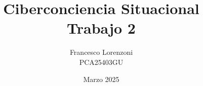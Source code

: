 


\title{Ciberconciencia Situacional\\Trabajo 2}
\author{Francesco Lorenzoni\\\textsc{PCA25403GU}}


\date{Marzo 2025}


\makeatletter
\renewcommand{\l@section}{\@dottedtocline{1}{1.5em}{2.6em}}
\renewcommand{\l@subsection}{\@dottedtocline{2}{2.5em}{3.6em}}
\renewcommand{\l@subsubsection}{\@dottedtocline{3}{3.5em}{4.5em}}
\makeatother
{} %



\doparttoc[n]



\tableofcontents



